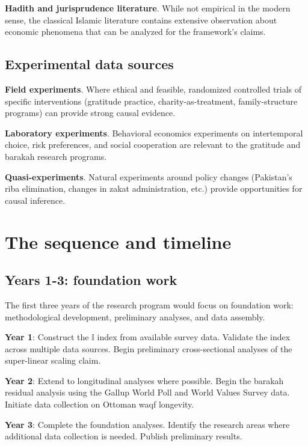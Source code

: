 \textbf{Hadith and jurisprudence literature}. While not empirical
in the modern sense, the classical Islamic literature contains
extensive observation about economic phenomena that can be
analyzed for the framework's claims.

\subsection{Experimental data sources}

\textbf{Field experiments}. Where ethical and feasible, randomized
controlled trials of specific interventions (gratitude practice,
charity-as-treatment, family-structure programs) can provide
strong causal evidence.

\textbf{Laboratory experiments}. Behavioral economics experiments
on intertemporal choice, risk preferences, and social cooperation
are relevant to the gratitude and barakah research programs.

\textbf{Quasi-experiments}. Natural experiments around policy
changes (Pakistan's riba elimination, changes in zakat
administration, etc.) provide opportunities for causal inference.

\section{The sequence and timeline}
\label{sec:agenda-sequence}

\subsection{Years 1-3: foundation work}

The first three years of the research program would focus on
foundation work: methodological development, preliminary
analyses, and data assembly.

\textbf{Year 1}: Construct the $\mathbb{I}$ index from available
survey data. Validate the index across multiple data sources.
Begin preliminary cross-sectional analyses of the
super-linear scaling claim.

\textbf{Year 2}: Extend to longitudinal analyses where possible.
Begin the barakah residual analysis using the Gallup World Poll
and World Values Survey data. Initiate data collection on Ottoman
waqf longevity.

\textbf{Year 3}: Complete the foundation analyses. Identify the
research areas where additional data collection is needed.
Publish preliminary results.

